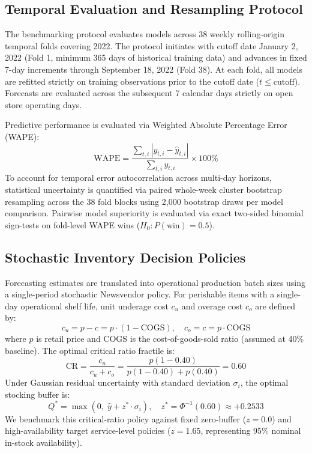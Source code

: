 \documentclass[conference]{IEEEtran}
\begin{document}
\subsection{Temporal Evaluation and Resampling Protocol}
The benchmarking protocol evaluates models across 38 weekly rolling-origin temporal folds covering 2022. The protocol initiates with cutoff date January 2, 2022 (Fold 1, minimum 365 days of historical training data) and advances in fixed 7-day increments through September 18, 2022 (Fold 38). At each fold, all models are refitted strictly on training observations prior to the cutoff date ($t \le \text{cutoff}$). Forecasts are evaluated across the subsequent 7 calendar days strictly on open store operating days.

Predictive performance is evaluated via Weighted Absolute Percentage Error (WAPE):
\begin{equation}
\text{WAPE} = \frac{\sum_{t,i} |y_{t,i} - \hat{y}_{t,i}|}{\sum_{t,i} y_{t,i}} \times 100\%
\end{equation}
To account for temporal error autocorrelation across multi-day horizons, statistical uncertainty is quantified via paired whole-week cluster bootstrap resampling across the 38 fold blocks using 2,000 bootstrap draws per model comparison. Pairwise model superiority is evaluated via exact two-sided binomial sign-tests on fold-level WAPE wins ($H_0: P(\text{win}) = 0.5$).

\subsection{Stochastic Inventory Decision Policies}
Forecasting estimates are translated into operational production batch sizes using a single-period stochastic Newsvendor policy. For perishable items with a single-day operational shelf life, unit underage cost $c_u$ and overage cost $c_o$ are defined by:
\begin{equation}
c_u = p - c = p \cdot (1 - \text{COGS}), \quad c_o = c = p \cdot \text{COGS}
\end{equation}
where $p$ is retail price and $\text{COGS}$ is the cost-of-goods-sold ratio (assumed at 40\% baseline). The optimal critical ratio fractile is:
\begin{equation}
\text{CR} = \frac{c_u}{c_u + c_o} = \frac{p(1 - 0.40)}{p(1 - 0.40) + p(0.40)} = 0.60
\end{equation}
Under Gaussian residual uncertainty with standard deviation $\sigma_i$, the optimal stocking buffer is:
\begin{equation}
Q^* = \max\left(0, \;\hat{y} + z^* \cdot \sigma_i\right), \quad z^* = \Phi^{-1}(0.60) \approx +0.2533
\end{equation}
We benchmark this critical-ratio policy against fixed zero-buffer ($z=0.0$) and high-availability target service-level policies ($z=1.65$, representing 95\% nominal in-stock availability).
\end{document}
